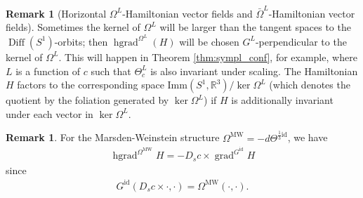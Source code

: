 \documentclass[12pt]{amsart}
\theoremstyle{definition}
\newtheorem{remark}[theorem]{Remark}
\newcommand{\Diff}{\operatorname{Diff}(S^1)}
\newcommand{\id}{\mathrm{id}}
\newcommand{\Imm}{\mathrm{Imm}}
\newcommand{\OmMW}{\Omega^{\operatorname{MW}}}
\def\Th{\Theta}
\def\Om{\Omega}
\def\x{\times}
\let\on=\operatorname
\begin{document}
\begin{remark}[Horizontal $\Om^L$-Hamiltonian vector fields and  $\bar\Om^{L}$-Hamiltonian vector fields]
Sometimes the kernel of $\Om^L$ will be larger than the tangent spaces to the $\Diff$-orbits; then $\on{hgrad}^{\Om^L}(H)$ will be chosen $G^L$-perpendicular to the kernel of $\Om^L$. This will happen in Theorem \ref{thm:sympl_conf}, for example, where $L$ is a function of $c$ such that $\Th_c^L$ is also invariant under scaling. 
The Hamiltonian $H$  factors to the corresponding space $\Imm(S^1,\mathbb R^3)/\ker\Om^L$  (which  denotes the quotient by the foliation generated by $\ker\Om^L$) if $H$ is additionally invariant under each vector in $\ker\Om^L$.
\end{remark}

\begin{remark}\label{rmk:horizontal_MW_field}
    For the Marsden-Weinstein structure $\OmMW=-d\Th^{\frac{1}{3}\id}$, we have 
    \begin{align*}
        \on{hgrad}^{\OmMW} H = - D_s c \x  \on{grad}^{G^\id} H
    \end{align*}
    since 
    \begin{align*}
        G^\id(D_s c \x \cdot, \cdot)=\OmMW(\cdot,\cdot).
    \end{align*}
\end{remark}

  
\end{document}
